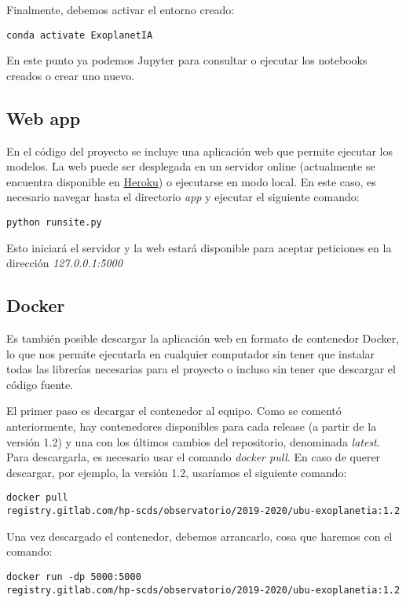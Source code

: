 Finalmente, debemos activar el entorno creado:

\texttt{conda activate ExoplanetIA}

En este punto ya podemos Jupyter para consultar o ejecutar los notebooks creados o crear uno nuevo.

\subsection{Web app}

En el código del proyecto se incluye una aplicación web que permite ejecutar los modelos. La web puede ser desplegada en un servidor online (actualmente se encuentra disponible en \href{https://exoplanetia.herokuapp.com/}{Heroku}) o ejecutarse en modo local. En este caso, es necesario navegar hasta el directorio \textit{app} y ejecutar el siguiente comando:

\texttt{python runsite.py}

Esto iniciará el servidor y la web estará disponible para aceptar peticiones en la dirección \textit{127.0.0.1:5000} 

\subsection{Docker}

Es también posible descargar la aplicación web en formato de contenedor Docker, lo que nos permite ejecutarla en cualquier computador sin tener que instalar todas las librerías necesarias para el proyecto o incluso sin tener que descargar el código fuente.

El primer paso es decargar el contenedor al equipo. Como se comentó anteriormente, hay contenedores disponibles para cada release (a partir de la versión 1.2) y una con los últimos cambios del repositorio, denominada \textit{latest}. Para descargarla, es necesario usar el comando \textit{docker pull}. En caso de querer descargar, por ejemplo, la versión 1.2, usaríamos el siguiente comando:

\texttt{docker pull \\ registry.gitlab.com/hp-scds/observatorio/2019-2020/ubu-exoplanetia:1.2}

Una vez descargado el contenedor, debemos arrancarlo, cosa que haremos con el comando:

\texttt{docker run -dp 5000:5000 \\ registry.gitlab.com/hp-scds/observatorio/2019-2020/ubu-exoplanetia:1.2}

